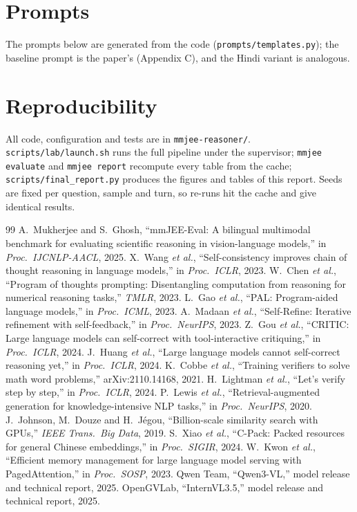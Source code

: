 \documentclass[conference]{IEEEtran}
\begin{document}
\clearpage
\appendices
\section{Prompts}
The prompts below are generated from the code (\texttt{prompts/templates.py}); the baseline
prompt is the paper's (Appendix C), and the Hindi variant is analogous.
{\footnotesize }

\section{Reproducibility}
All code, configuration and tests are in \texttt{mmjee-reasoner/}. \texttt{scripts/lab/launch.sh}
runs the full pipeline under the supervisor; \texttt{mmjee evaluate} and \texttt{mmjee report}
recompute every table from the cache; \texttt{scripts/final\_report.py} produces the figures and
tables of this report. Seeds are fixed per question, sample and turn, so re-runs hit the cache
and give identical results.

\begin{thebibliography}{99}\footnotesize
{} A.~Mukherjee and S.~Ghosh, ``mmJEE-Eval: A bilingual multimodal benchmark for
evaluating scientific reasoning in vision-language models,'' in \emph{Proc.\ IJCNLP-AACL}, 2025.
 X.~Wang \emph{et al.}, ``Self-consistency improves chain of thought
reasoning in language models,'' in \emph{Proc.\ ICLR}, 2023.
 W.~Chen \emph{et al.}, ``Program of thoughts prompting: Disentangling computation
from reasoning for numerical reasoning tasks,'' \emph{TMLR}, 2023.
 L.~Gao \emph{et al.}, ``PAL: Program-aided language models,'' in \emph{Proc.\
ICML}, 2023.
 A.~Madaan \emph{et al.}, ``Self-Refine: Iterative refinement with
self-feedback,'' in \emph{Proc.\ NeurIPS}, 2023.
 Z.~Gou \emph{et al.}, ``CRITIC: Large language models can self-correct with
tool-interactive critiquing,'' in \emph{Proc.\ ICLR}, 2024.
 J.~Huang \emph{et al.}, ``Large language models cannot self-correct
reasoning yet,'' in \emph{Proc.\ ICLR}, 2024.
 K.~Cobbe \emph{et al.}, ``Training verifiers to solve math word problems,''
arXiv:2110.14168, 2021.
 H.~Lightman \emph{et al.}, ``Let's verify step by step,'' in \emph{Proc.\
ICLR}, 2024.
\bibitem{rag} P.~Lewis \emph{et al.}, ``Retrieval-augmented generation for knowledge-intensive
NLP tasks,'' in \emph{Proc.\ NeurIPS}, 2020.
\bibitem{faiss} J.~Johnson, M.~Douze and H.~J\'egou, ``Billion-scale similarity search with
GPUs,'' \emph{IEEE Trans.\ Big Data}, 2019.
\bibitem{bge} S.~Xiao \emph{et al.}, ``C-Pack: Packed resources for general Chinese
embeddings,'' in \emph{Proc.\ SIGIR}, 2024.
\bibitem{vllm} W.~Kwon \emph{et al.}, ``Efficient memory management for large language model
serving with PagedAttention,'' in \emph{Proc.\ SOSP}, 2023.
\bibitem{qwen3vl} Qwen Team, ``Qwen3-VL,'' model release and technical report, 2025.
\bibitem{internvl35} OpenGVLab, ``InternVL3.5,'' model release and technical report, 2025.
\end{thebibliography}
\end{document}
